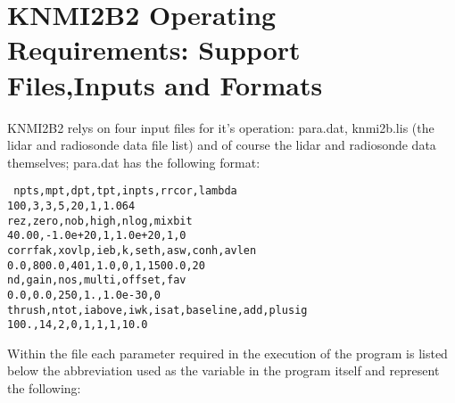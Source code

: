 \section{KNMI2B2 Operating Requirements: Support Files,Inputs and Formats}

KNMI2B2 relys on four input files for it's operation: para.dat, knmi2b.lis
(the lidar and radiosonde data file list) and of course the lidar and 
radiosonde data themselves; para.dat has the following format:


\noindent
{\tt
npts,mpt,dpt,tpt,inpts,rrcor,lambda\\
100,3,3,5,20,1,1.064\\
rez,zero,nob,high,nlog,mixbit\\
40.00,-1.0e+20,1,1.0e+20,1,0\\
corrfak,xovlp,ieb,k,seth,asw,conh,avlen\\
0.0,800.0,401,1.0,0,1,1500.0,20\\
nd,gain,nos,multi,offset,fav\\
0.0,0.0,250,1.,1.0e-30,0\\
thrush,ntot,iabove,iwk,isat,baseline,add,plusig\\
100.,14,2,0,1,1,1,10.0\\
}

\noindent
Within the file each parameter required in the execution of the program
is listed below the abbreviation used as the variable in the program 
itself and represent the following:


